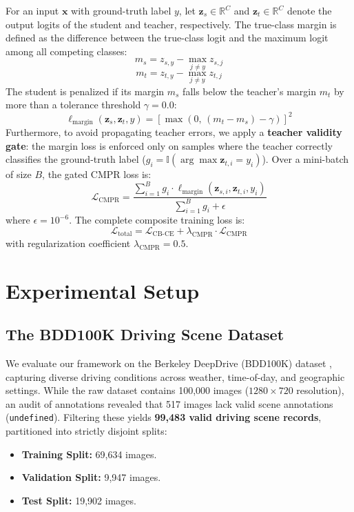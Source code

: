 \documentclass[conference]{IEEEtran}
\begin{document}
For an input $\mathbf{x}$ with ground-truth label $y$, let $\mathbf{z}_s \in \mathbb{R}^C$ and $\mathbf{z}_t \in \mathbb{R}^C$ denote the output logits of the student and teacher, respectively. The true-class margin is defined as the difference between the true-class logit and the maximum logit among all competing classes:
\begin{equation}
m_s = z_{s, y} - \max_{j \neq y} z_{s, j}
\end{equation}
\begin{equation}
m_t = z_{t, y} - \max_{j \neq y} z_{t, j}
\end{equation}
The student is penalized if its margin $m_s$ falls below the teacher's margin $m_t$ by more than a tolerance threshold $\gamma = 0.0$:
\begin{equation}
\ell_{\text{margin}}(\mathbf{z}_s, \mathbf{z}_t, y) = \left[\max\left(0, \, (m_t - m_s) - \gamma\right)\right]^2
\end{equation}
Furthermore, to avoid propagating teacher errors, we apply a \textbf{teacher validity gate}: the margin loss is enforced only on samples where the teacher correctly classifies the ground-truth label ($g_i = \mathbb{I}(\arg\max \mathbf{z}_{t, i} = y_i)$). Over a mini-batch of size $B$, the gated CMPR loss is:
\begin{equation}
\mathcal{L}_{\text{CMPR}} = \frac{\sum_{i=1}^B g_i \cdot \ell_{\text{margin}}(\mathbf{z}_{s, i}, \mathbf{z}_{t, i}, y_i)}{\sum_{i=1}^B g_i + \epsilon}
\end{equation}
where $\epsilon = 10^{-6}$. The complete composite training loss is:
\begin{equation}
\mathcal{L}_{\text{total}} = \mathcal{L}_{\text{CB-CE}} + \lambda_{\text{CMPR}} \cdot \mathcal{L}_{\text{CMPR}}
\end{equation}
with regularization coefficient $\lambda_{\text{CMPR}} = 0.5$.

\section{Experimental Setup}

\subsection{The BDD100K Driving Scene Dataset}
We evaluate our framework on the Berkeley DeepDrive (BDD100K) dataset \cite{yu2020bdd100k}, capturing diverse driving conditions across weather, time-of-day, and geographic settings. While the raw dataset contains 100,000 images ($1280 \times 720$ resolution), an audit of annotations revealed that 517 images lack valid scene annotations (\texttt{undefined}). Filtering these yields \textbf{99,483 valid driving scene records}, partitioned into strictly disjoint splits:
\begin{itemize}
    \item \textbf{Training Split:} 69,634 images.
    \item \textbf{Validation Split:} 9,947 images.
    \item \textbf{Test Split:} 19,902 images.
\end{itemize}
\end{document}

